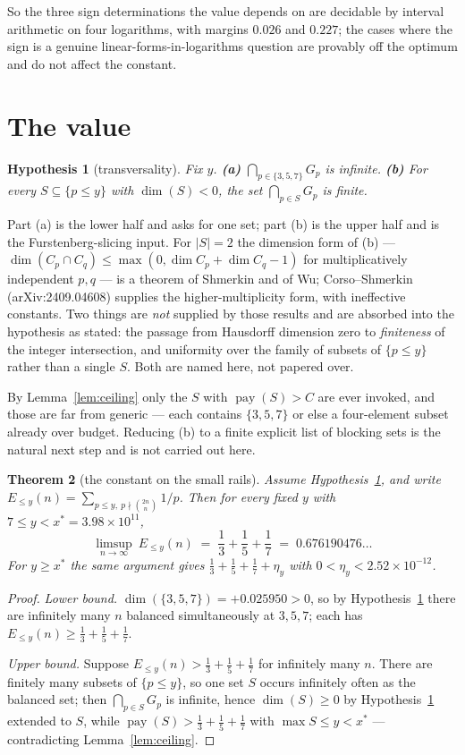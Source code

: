 \documentclass[11pt]{article}
\newtheorem{theorem}{Theorem}
\newtheorem{hypothesis}[theorem]{Hypothesis}
\begin{document}
So the three sign determinations the value depends on are decidable by interval
arithmetic on four logarithms, with margins $0.026$ and $0.227$; the cases where
the sign is a genuine linear-forms-in-logarithms question are provably off the
optimum and do not affect the constant.

\section{The value}

\begin{hypothesis}[transversality]\label{hyp:T}
Fix $y$.  \textbf{(a)} $\bigcap_{p\in\{3,5,7\}}G_p$ is infinite.
\textbf{(b)} For every $S\subseteq\{p\le y\}$ with $\dim(S)<0$, the set
$\bigcap_{p\in S}G_p$ is finite.
\end{hypothesis}

Part (a) is the lower half and asks for one set; part (b) is the upper half and
is the Furstenberg-slicing input.  For $|S|=2$ the dimension form of (b) ---
$\dim(C_p\cap C_q)\le\max(0,\dim C_p+\dim C_q-1)$ for multiplicatively
independent $p,q$ --- is a theorem of Shmerkin and of Wu; Corso--Shmerkin
(arXiv:2409.04608) supplies the higher-multiplicity form, with ineffective
constants.  Two things are \emph{not} supplied by those results and are
absorbed into the hypothesis as stated: the passage from Hausdorff dimension
zero to \emph{finiteness} of the integer intersection, and uniformity over the
family of subsets of $\{p\le y\}$ rather than a single $S$.  Both are named
here, not papered over.

By Lemma~\ref{lem:ceiling} only the $S$ with $\operatorname{pay}(S)>C$ are ever
invoked, and those are far from generic --- each contains $\{3,5,7\}$ or else a
four-element subset already over budget.  Reducing (b) to a finite explicit list
of blocking sets is the natural next step and is not carried out here.

\begin{theorem}[the constant on the small rails]\label{thm:main}
Assume Hypothesis~\ref{hyp:T}, and write
$E_{\le y}(n)=\sum_{p\le y,\ p\nmid\binom{2n}{n}}1/p$.  Then for every fixed
$y$ with $7\le y<x^\ast=3.98\times10^{11}$,
\[
  \boxed{\;\limsup_{n\to\infty}\ E_{\le y}(n)
  \;=\;\frac13+\frac15+\frac17\;=\;0.676190476\ldots\;}
\]
For $y\ge x^\ast$ the same argument gives
$\frac13+\frac15+\frac17+\eta_y$ with $0<\eta_y<2.52\times10^{-12}$.
\end{theorem}

\begin{proof}
\emph{Lower bound.}  $\dim(\{3,5,7\})=+0.025950>0$, so by
Hypothesis~\ref{hyp:T} there are infinitely many $n$ balanced simultaneously at
$3,5,7$; each has $E_{\le y}(n)\ge\frac13+\frac15+\frac17$.

\emph{Upper bound.}  Suppose $E_{\le y}(n)>\frac13+\frac15+\frac17$ for
infinitely many $n$.  There are finitely many subsets of $\{p\le y\}$, so one
set $S$ occurs infinitely often as the balanced set; then $\bigcap_{p\in S}G_p$
is infinite, hence $\dim(S)\ge0$ by Hypothesis~\ref{hyp:T} extended to $S$,
while $\operatorname{pay}(S)>\frac13+\frac15+\frac17$ with
$\max S\le y<x^\ast$ --- contradicting Lemma~\ref{lem:ceiling}.
\end{proof}
\end{document}
